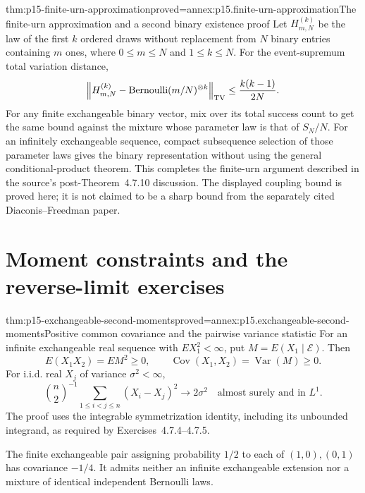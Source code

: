 \begin{hbtheorem}{thm:p15-finite-urn-approximation}{proved=annex:p15.finite-urn-approximation}{The finite-urn approximation and a second binary existence proof}
Let \(H_{m,N}^{(k)}\) be the law of the first \(k\) ordered draws
without replacement from \(N\) binary entries containing \(m\) ones,
where \(0\leq m\leq N\) and \(1\leq k\leq N\).
For the event-supremum total variation distance,
\[
 \left\|H_{m,N}^{(k)}
      -\operatorname{Bernoulli}(m/N)^{\otimes k}\right\|_{\rm TV}
                         \leq\frac{k(k-1)}{2N}.
\]
For any finite exchangeable binary vector, mix over its total
success count to get the same bound against the mixture whose
parameter law is that of \(S_N/N\).
For an infinitely exchangeable sequence, compact subsequence
selection of those parameter laws gives the binary representation
without using the general conditional-product theorem.
This completes the finite-urn argument described in the source's
post-Theorem~4.7.10 discussion. The displayed coupling bound is
proved here; it is not claimed to be a sharp bound from the
separately cited Diaconis--Freedman paper.
\end{hbtheorem}

\section{Moment constraints and the reverse-limit exercises}

\begin{hbtheorem}{thm:p15-exchangeable-second-moments}{proved=annex:p15.exchangeable-second-moments}{Positive common covariance and the pairwise variance statistic}
For an infinite exchangeable real sequence with \(EX_1^2<\infty\), put
\(M=E(X_1\mid\mathcal E)\). Then
\[
 E(X_1X_2)=EM^2\geq0,\qquad
 \operatorname{Cov}(X_1,X_2)=\operatorname{Var}(M)\geq0.
\]
For i.i.d. real \(X_j\) of variance \(\sigma^2<\infty\),
\[
            \binom n2^{-1}\sum_{1\leq i<j\leq n}(X_i-X_j)^2
                      \longrightarrow2\sigma^2
                            \quad\text{almost surely and in }L^1.
\]
The proof uses the integrable symmetrization identity, including
its unbounded integrand, as required by Exercises~4.7.4--4.7.5.

The finite exchangeable pair assigning probability \(1/2\) to each
of \((1,0),(0,1)\) has covariance \(-1/4\).
It admits neither an infinite exchangeable extension nor a mixture
of identical independent Bernoulli laws.
\end{hbtheorem}

